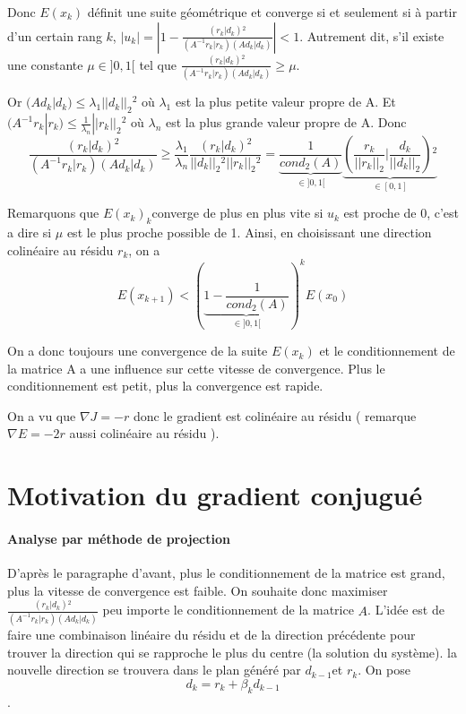 \documentclass[french]{article}
\begin{document}
Donc $E(x_{k})$ définit une suite géométrique et converge si et seulement
si à partir d'un certain rang $k$, $|u_{k}|=|1-\frac{(r_{k}|d_{k}){{}^2}}{(A^{-1}r_{k}|r_{k})(Ad_{k}|d_{k})}|<1$.
Autrement dit, s'il existe une constante $\mu\in]0,1[$ tel que $\frac{(r_{k}|d_{k}){{}^2}}{(A^{-1}r_{k}|r_{k})(Ad_{k}|d_{k})}\geq\mu$.

Or $(Ad_{k}|d_{k})\leq\lambda_{1}||d_{k}||_{2}{{}^2}$ où $\lambda_{1}$
est la plus petite valeur propre de A. Et $(A^{-1}r_{k}|r_{k})\leq\frac{1}{\lambda_{n}}||r_{k}||_{2}{{}^2}$
où $\lambda_{n}$ est la plus grande valeur propre de A. Donc 
\[
\frac{(r_{k}|d_{k}){{}^2}}{(A^{-1}r_{k}|r_{k})(Ad_{k}|d_{k})}\geq\frac{\lambda_{1}}{\lambda_{n}}\frac{(r_{k}|d_{k}){{}^2}}{||d_{k}||_{2}{{}^2}||r_{k}||_{2}{{}^2}}=\underbrace{\frac{1}{cond_{2}(A)}}_{\in]0,1[}\underbrace{(\frac{r_{k}}{||r_{k}||_{2}}|\frac{d_{k}}{||d_{k}||_{2}}){{}^2}}_{\in[0,1]}
\]

Remarquons que $E(x_{k})_{k}$converge de plus en plus vite si $u_{k}$
est proche de 0, c'est a dire si $\mu$ est le plus proche possible
de 1. Ainsi, en choisissant une direction colinéaire au résidu $r_{k}$,
on a 
\[
E(x_{k+1})<(\underbrace{1-\frac{1}{cond_{2}(A)}}_{\in]0,1[})^{k}E(x_{0})
\]

On a donc toujours une convergence de la suite $E(x_{k})$ et le conditionnement
de la matrice A a une influence sur cette vitesse de convergence.
Plus le conditionnement est petit, plus la convergence est rapide.

On a vu que $\nabla J=-r$ donc le gradient est colinéaire au résidu
( remarque $\nabla E=-2r$ aussi colinéaire au résidu ).

\newpage{}

\part{Motivation du gradient conjugué}

\subsection{Analyse par méthode de projection}

D'après le paragraphe d'avant, plus le conditionnement de la matrice
est grand, plus la vitesse de convergence est faible. On souhaite
donc maximiser $\frac{(r_{k}|d_{k}){{}^2}}{(A^{-1}r_{k}|r_{k})(Ad_{k}|d_{k})}$
peu importe le conditionnement de la matrice $A$. L'idée est de faire
une combinaison linéaire du résidu et de la direction précédente pour
trouver la direction qui se rapproche le plus du centre (la solution
du système). la nouvelle direction se trouvera dans le plan généré
par $d_{k-1}$et $r_{k}$. On pose 
\begin{equation}
d_{k}=r_{k}+\beta_{k}d_{k-1}
\end{equation}
.
\end{document}
